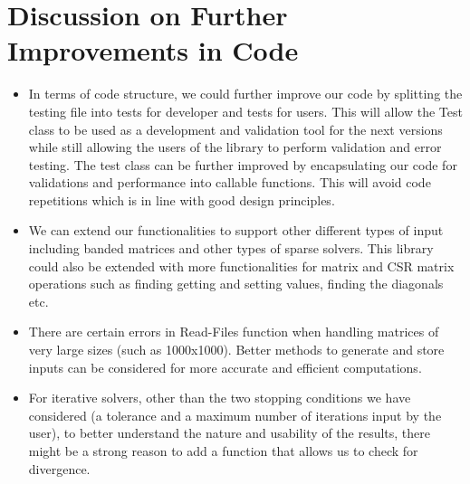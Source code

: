 \documentclass[twoside,twocolumn]{article}
\begin{document}
\section{Discussion on Further Improvements in Code}
\begin{itemize}
\item In terms of code structure, we could further improve our code by splitting the testing file into tests for developer and tests for users. This will allow the Test class to be used as a development and validation tool for the next versions while still allowing the users of the library to perform validation and error testing. The test class can be further improved by encapsulating our code for validations and performance into callable functions. This will avoid code repetitions which is in line with good design principles. 
\item We can extend our functionalities to support other different types of input including banded matrices and other types of sparse solvers. This library could also be extended with more functionalities for matrix and CSR matrix operations such as finding getting and setting values, finding the diagonals etc.

\item There are certain errors in Read-Files function when handling matrices of very large sizes (such as 1000x1000). Better methods to generate and store inputs can be considered for more accurate and efficient computations.
\item For iterative solvers, other than the two stopping conditions we have considered (a tolerance  and a maximum number of iterations input by the user), to better understand the nature and usability of the results, there might be a strong reason to add a function that allows us to check for divergence. 
\end{itemize}
\end{document}
